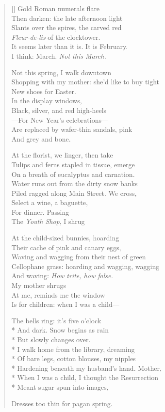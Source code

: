 \label{ch:requiescat}
\settowidth{\versewidth}{Shopping with my mother: she'd like to buy tight}
\begin{verse}[\versewidth]
Gold Roman numerals flare\\
Then darken: the late afternoon light\\
Slants over the spires, the carved red\\
\textit{Fleur-de-lis} of the clocktower.\\
It seems later than it is. It is February.\\
I think: March. \textit{Not this March.}

Not this spring, I walk downtown\\
Shopping with my mother: she'd like to buy tight\\
New shoes for Easter.\\
In the display windows,\\
Black, silver, and red high-heels\\
---For New Year's celebrations---\\
Are replaced by wafer-thin sandals, pink\\
And grey and bone.

At the florist, we linger, then take\\
Tulips and ferns stapled in tissue, emerge\\
On a breath of eucalyptus and carnation.\\
Water runs out from the dirty snow banks\\
Piled ragged along Main Street. \qquad We cross,\\
Select a wine, a baguette,\\
For dinner. \qquad Passing\\
The \textit{Youth Shop}, I shrug

At the child-sized bunnies, hoarding\\
Their cache of pink and canary eggs,\\
Waving and wagging from their nest of green\\
Cellophane grass: hoarding and wagging, wagging\\
And waving: \textit{How trite, how false.}\\
My mother shrugs\\
At me, reminds me the window\\
Is for children: when I was a child---

The bells ring: it's five o'clock\\*
And dark. Snow begins as rain\\*
But slowly changes over.\\*
I walk home from the library, dreaming\\*
Of bare legs, cotton blouses, my nipples\\*
Hardening beneath my husband's hand. Mother,\\*
When I was a child, I thought the Resurrection\\*
Meant sugar spun into images,

Dresses too thin for pagan spring.
\end{verse}
